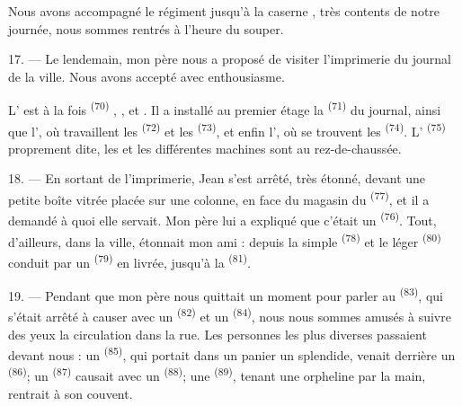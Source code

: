 Nous avons accompagné le régiment jusqu'à la caserne , très contents
de notre journée, nous sommes rentrés à l'heure du souper.

\VUsaut{3.0mm}

17. --- Le lendemain, mon père nous a proposé de visiter l'imprimerie du journal
de la ville. Nous avons accepté avec enthousiasme.

L' est à la fois  \textsuperscript{(70)}
, ,  et
. Il a installé au premier étage la 
\textsuperscript{(71)} du journal, ainsi que l', où
travaillent les  \textsuperscript{(72)} et les
 \textsuperscript{(73)}, et enfin l', où se trouvent les 
\textsuperscript{(74)}. L' \textsuperscript{(75)} proprement
dite, les  et les différentes machines sont au rez-de-chaussée.

\VUsaut{3.0mm}

18. --- En sortant de l'imprimerie, Jean s'est arrêté, très étonné, devant une
petite boîte vitrée placée sur une colonne, en face du magasin du
 \textsuperscript{(77)}, et il a demandé à quoi elle servait.
Mon père lui a expliqué que c'était un 
\textsuperscript{(76)}. Tout, d'ailleurs, dans la ville, étonnait mon ami :
depuis la simple  \textsuperscript{(78)} et le léger
 \textsuperscript{(80)} conduit par un 
\textsuperscript{(79)} en livrée, jusqu'à la 
\textsuperscript{(81)}.

19. --- Pendant que mon père nous quittait un moment pour parler au
 \textsuperscript{(83)}, qui s'était arrêté à causer avec un
 \textsuperscript{(82)} et un 
\textsuperscript{(84)}, nous nous sommes amusés à suivre des yeux la circulation
dans la rue. Les personnes les plus diverses passaient devant nous : un
 \textsuperscript{(85)}, qui portait dans un panier un
 splendide, venait derrière un 
\textsuperscript{(86)}; un 
\textsuperscript{(87)} causait avec un  \textsuperscript{(88)};
une  \textsuperscript{(89)}, tenant une orpheline par la
main, rentrait à son couvent.

